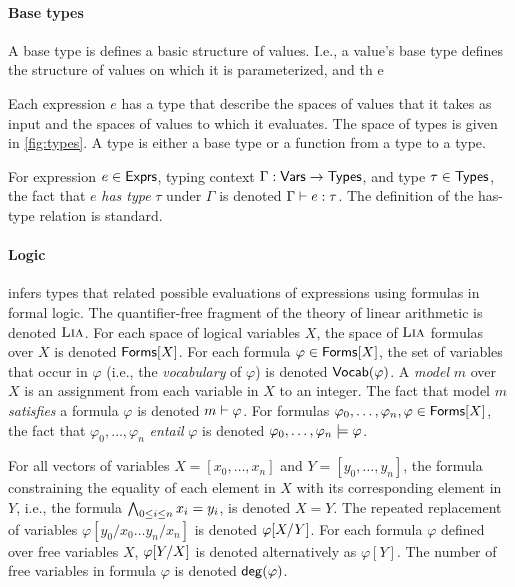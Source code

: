 \paragraph{Base types}
%
A base type is defines a basic structure of values.
%
I.e., a value's base type defines the structure of values on which it
is parameterized, and th e

%
Each expression $e$ has a type that describe the spaces of values that
it takes as input and the spaces of values to which it evaluates.
%
The space of types is given in \autoref{fig:types}.
%
A type is either a base type or a function from a type to a type.

For expression $e \in \expr$, typing context $\Gamma : \vars \to
\types$, and type $\tau \in \types$, the fact that $e$ \emph{has type}
$\tau$ under $\Gamma$ is denoted $\Gamma \judges e : \tau$.
%
The definition of the has-type relation is standard.

\paragraph{Logic}
%
\sys infers types that related possible evaluations of expressions
using formulas in formal logic.
%
The quantifier-free fragment of the theory of linear arithmetic is
denoted $\lia$.
%
For each space of logical variables $X$, the space of $\lia$ formulas
over $X$ is denoted $\formulas{ X }$.
%
For each formula $\varphi \in \formulas{X}$, the set of variables that
occur in $\varphi$ (i.e., the \emph{vocabulary} of $\varphi$) is
denoted $\vocab(\varphi)$.
A \lia \emph{model} $m$ over $X$ is an assignment from each variable
in $X$ to an integer.
%
The fact that model $m$ \emph{satisfies} a formula $\varphi$ is
denoted $m \sats \varphi$.
%
For formulas $\varphi_0, \ldots, \varphi_n, \varphi \in \formulas{X}$,
the fact that $\varphi_0, \ldots, \varphi_n$ \emph{entail} $\varphi$
is denoted $\varphi_0, \ldots, \varphi_n \entails \varphi$.

For all vectors of variables $X = [ x_0, \ldots, x_n ]$ and $Y = [
y_0, \ldots, y_n ]$, the \lia formula constraining the equality of
each element in $X$ with its corresponding element in $Y$, i.e., the
formula $\bigland_{0 \leq i \leq n} x_i = y_i$, is denoted $X = Y$.
%
The repeated replacement of variables $\varphi[ y_0 / x_0 \ldots y_{n}
/ x_{n} ]$ is denoted $\replace{\varphi}{Y}{X}$.
%
For each formula $\varphi$ defined over free variables $X$,
$\replace{\varphi}{X}{Y}$ is denoted alternatively as $\varphi[Y]$.
%
The number of free variables in formula $\varphi$ is denoted
$\degreeof(\varphi)$.

